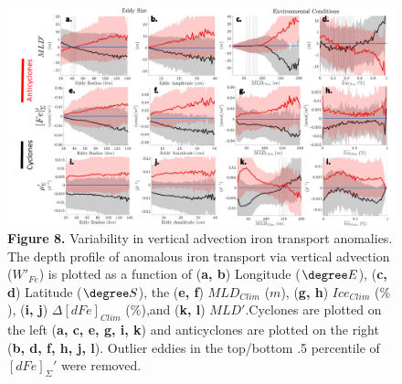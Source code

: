 \begin{figure}[!htbp]
    \begin{adjustwidth}{-3.6in}{-1.2in}
    \centering
        \includegraphics[scale=1]{Fig8.pdf}
    \end{adjustwidth}
    \caption[Variability in vertical advection iron transport anomalies]
    {\textbf{Figure 8.} Variability in vertical advection iron transport anomalies. The depth profile of anomalous iron transport via vertical advection ($W'_{Fe}$) is plotted as a function of (\textbf{a, b}) Longitude ($\degree E$), (\textbf{c, d}) Latitude ($\degree S$), the (\textbf{e, f}) $MLD_{Clim}$ ($m$), (\textbf{g, h}) $Ice_{Clim}$ ($\%$), (\textbf{i, j}) $\Delta[dFe]_{Clim}$ ($\%$),and (\textbf{k, l}) $MLD'$.Cyclones are plotted on the left (\textbf{a, c, e, g, i, k}) and anticyclones are plotted on the right (\textbf{b, d, f, h, j, l}). Outlier eddies in the top/bottom .5 percentile of $[dFe]_\Sigma'$ were removed. }
\label{fig:Fig8}
\end{figure}



